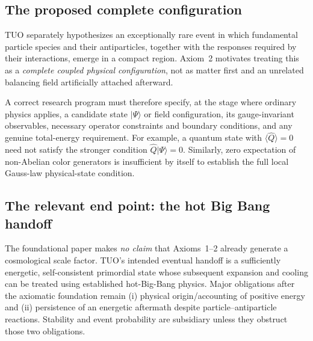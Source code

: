 \documentclass[11pt,a4paper]{article}
\newcommand{\ave}[1]{\langle #1\rangle}
\theoremstyle{tmon}
\theoremstyle{definition}
\begin{document}
\subsection{The proposed complete configuration}
TUO separately hypothesizes an exceptionally rare event in which fundamental particle species and their antiparticles, together with the responses required by their interactions, emerge in a compact region. Axiom~2 motivates treating this as a \emph{complete coupled physical configuration}, not as matter first and an unrelated balancing field artificially attached afterward.

A correct research program must therefore specify, at the stage where ordinary physics applies, a candidate state $|\Psi\rangle$ or field configuration, its gauge-invariant observables, necessary operator constraints and boundary conditions, and any genuine total-energy requirement. For example, a quantum state with $\ave{\hat Q}=0$ need not satisfy the stronger condition $\hat Q|\Psi\rangle=0$. Similarly, zero expectation of non-Abelian color generators is insufficient by itself to establish the full local Gauss-law physical-state condition.

\subsection{The relevant end point: the hot Big Bang handoff}
The foundational paper makes \emph{no claim} that Axioms~1--2 already generate a cosmological scale factor. TUO's intended eventual handoff is a sufficiently energetic, self-consistent primordial state whose subsequent expansion and cooling can be treated using established hot-Big-Bang physics. Major obligations after the axiomatic foundation remain (i) physical origin/accounting of positive energy and (ii) persistence of an energetic aftermath despite particle--antiparticle reactions. Stability and event probability are subsidiary unless they obstruct those two obligations.
\end{document}
